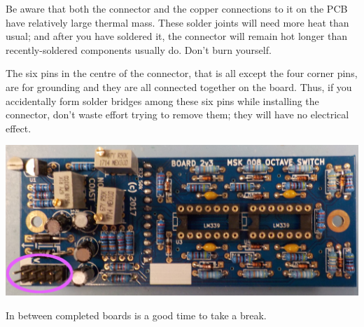 Be aware that both the connector and the copper connections to it on the PCB
have relatively large thermal mass.  These solder joints will need more
heat than usual; and after you have soldered it, the connector will remain
hot longer than recently-soldered components usually do.  Don't burn
yourself.

The six pins in the centre of the connector, that is all except the four
corner pins, are for grounding and they are all connected together on the
board.  Thus, if you accidentally form solder bridges among these six pins
while installing the connector, don't waste effort trying to remove them;
they will have no electrical effect.

\noindent\includegraphics[width=\linewidth]{power.jpg}

In between completed boards is a good time to take a break.
